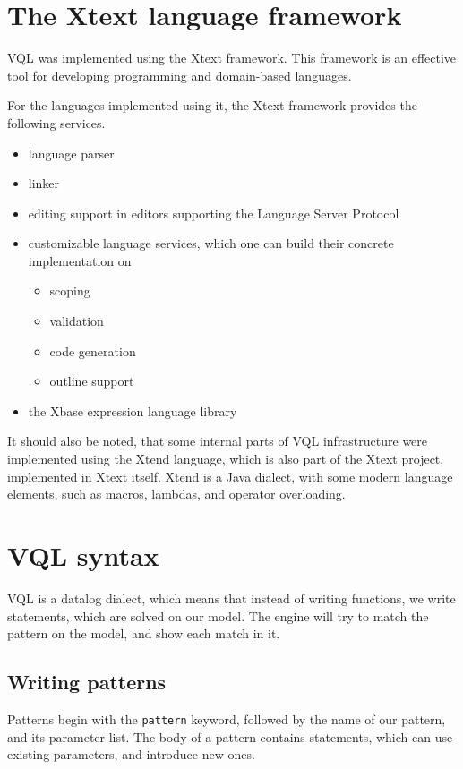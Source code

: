 \documentclass[11pt,a4paper,oneside]{report}
\begin{document}
\section{The Xtext language framework}
VQL was implemented using the Xtext framework. This framework is an effective
tool for developing programming and domain-based languages.

For the languages implemented using it, the Xtext framework provides the
following services\cite{xtext}.

\begin{itemize}
    \item{language parser}
    \item{linker}
    \item{editing support in editors supporting the Language Server Protocol}
    \item{
        customizable language services, which one can build their concrete
        implementation on
        \begin{itemize}
            \item{scoping}
            \item{validation}
            \item{code generation}
            \item{outline support}
        \end{itemize}
    }
    \item{the Xbase expression language library}
\end{itemize}

It should also be noted, that some internal parts of VQL infrastructure were
implemented using the Xtend language, which is also part of the Xtext project,
implemented in Xtext itself. Xtend is a Java dialect, with some modern language
elements, such as macros, lambdas, and operator overloading\cite{xtend}.

\section{VQL syntax}
VQL is a datalog dialect, which means that instead of writing functions, we
write statements, which are solved on our model. The engine will try to match
the pattern on the model, and show each match in it.

\subsection{Writing patterns}
Patterns begin with the \texttt{pattern} keyword, followed by the name of our
pattern, and its parameter list. The body of a pattern contains statements,
which can use existing parameters, and introduce new ones.
\end{document}
